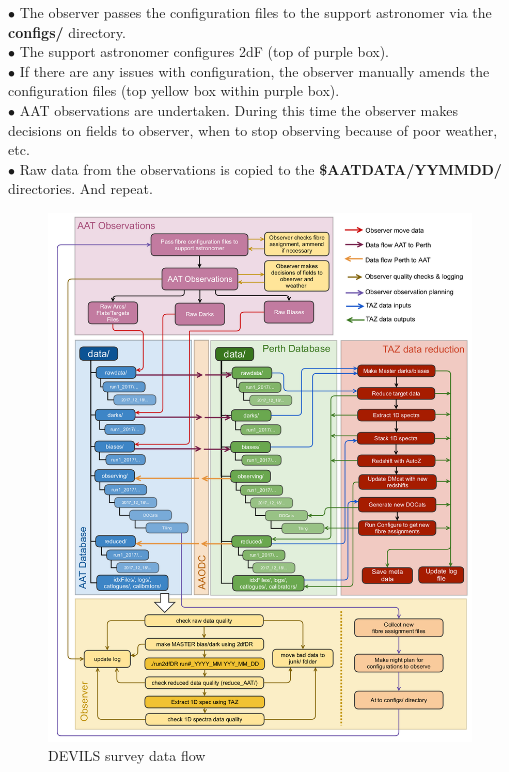 \documentclass[12pt]{article}
\begin{document}
$\bullet$ The observer passes the configuration files to the support astronomer via the \textbf{configs/} directory. \\ 

$\bullet$ The support astronomer configures 2dF (top of purple box). \\

$\bullet$ If there are any issues with configuration, the observer manually amends the configuration files (top yellow box within purple box).\\

$\bullet$ AAT observations are undertaken. During this time the observer makes decisions on fields to observer, when to stop observing because of poor weather, etc.  \\

$\bullet$ Raw data from the observations is copied to the \textbf{\$AATDATA/YYMMDD/} directories. And repeat. 

\begin{figure}
\begin{center}
\includegraphics[scale=0.17]{devils_taz_dataflow.png}
\caption{DEVILS survey data flow}
\label{fig:dataflow}
\end{center}
\end{figure}
\end{document}
